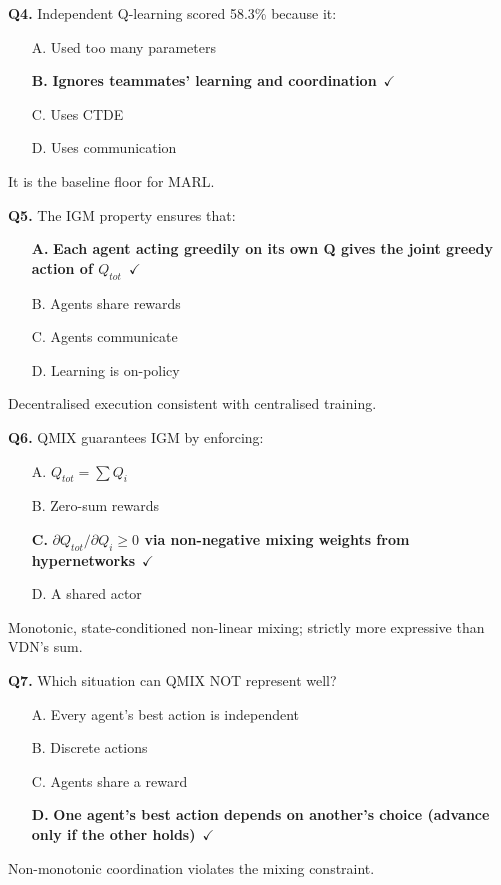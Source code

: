 \documentclass[11pt]{article}
\begin{document}
{\noindent\textbf{Q4.} Independent Q-learning scored 58.3\% because it:\begin{itemize}[leftmargin=2.2em,itemsep=0pt,topsep=1pt]\item[A.] Used too many parameters\item[\textbf{B.}] \textbf{Ignores teammates' learning and coordination}~{\color{GrnN}$\checkmark$}\item[C.] Uses CTDE\item[D.] Uses communication\end{itemize} It is the baseline floor for MARL.\par\medskip

\noindent\textbf{Q5.} The IGM property ensures that:\begin{itemize}[leftmargin=2.2em,itemsep=0pt,topsep=1pt]\item[\textbf{A.}] \textbf{Each agent acting greedily on its own Q gives the joint greedy action of $Q_{tot}$}~{\color{GrnN}$\checkmark$}\item[B.] Agents share rewards\item[C.] Agents communicate\item[D.] Learning is on-policy\end{itemize} Decentralised execution consistent with centralised training.\par\medskip

\noindent\textbf{Q6.} QMIX guarantees IGM by enforcing:\begin{itemize}[leftmargin=2.2em,itemsep=0pt,topsep=1pt]\item[A.] $Q_{tot}=\sum Q_i$\item[B.] Zero-sum rewards\item[\textbf{C.}] \textbf{$\partial Q_{tot}/\partial Q_i\ge0$ via non-negative mixing weights from hypernetworks}~{\color{GrnN}$\checkmark$}\item[D.] A shared actor\end{itemize} Monotonic, state-conditioned non-linear mixing; strictly more expressive than VDN's sum.\par\medskip

\noindent\textbf{Q7.} Which situation can QMIX NOT represent well?\begin{itemize}[leftmargin=2.2em,itemsep=0pt,topsep=1pt]\item[A.] Every agent's best action is independent\item[B.] Discrete actions\item[C.] Agents share a reward\item[\textbf{D.}] \textbf{One agent's best action depends on another's choice (advance only if the other holds)}~{\color{GrnN}$\checkmark$}\end{itemize} Non-monotonic coordination violates the mixing constraint.\par\medskip

}
\end{document}
